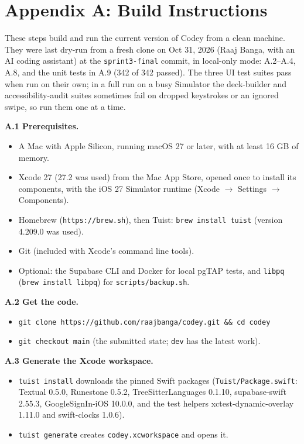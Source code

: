 \documentclass[12pt,letterpaper]{article}
\begin{document}
\section*{Appendix A: Build Instructions}\label{sec:appA}
These steps build and run the current version of Codey from a clean machine. They
were last dry-run from a fresh clone on Oct 31, 2026 (Raaj Banga, with an AI coding
assistant) at the \texttt{sprint3-final} commit, in local-only mode: A.2--A.4, A.8, and the
unit tests in A.9 (342 of 342 passed). The three UI test suites pass when run on their own;
in a full run on a busy Simulator the deck-builder and accessibility-audit suites
sometimes fail on dropped keystrokes or an ignored swipe, so run them one at a time.

\textbf{A.1 Prerequisites.}
\begin{itemize}
  \item A Mac with Apple Silicon, running macOS 27 or later, with at least
        16 GB of memory.
  \item Xcode 27 (27.2 was used) from the Mac App Store, opened once to install its components, with
        the iOS 27 Simulator runtime (Xcode $\to$ Settings $\to$ Components).
  \item Homebrew (\texttt{https://brew.sh}), then Tuist:
        \texttt{brew install tuist} (version 4.209.0 was used).
  \item Git (included with Xcode's command line tools).
  \item Optional: the Supabase CLI and Docker for local pgTAP tests, and
        \texttt{libpq} (\texttt{brew install libpq}) for \texttt{scripts/backup.sh}.
\end{itemize}

\textbf{A.2 Get the code.}
\begin{itemize}
  \item \texttt{git clone https://github.com/raajbanga/codey.git \&\& cd codey}
  \item \texttt{git checkout main} (the submitted state; \texttt{dev} has the latest work).
\end{itemize}

\textbf{A.3 Generate the Xcode workspace.}
\begin{itemize}
  \item \texttt{tuist install} downloads the pinned Swift packages
        (\texttt{Tuist/Package.swift}: Textual 0.5.0, Runestone 0.5.2,
        TreeSitterLanguages 0.1.10, supabase-swift 2.55.3, GoogleSignIn-iOS 10.0.0, and the
        test helpers xctest-dynamic-overlay 1.11.0 and swift-clocks 1.0.6).
  \item \texttt{tuist generate} creates \texttt{codey.xcworkspace} and opens it.
\end{itemize}
\end{document}
